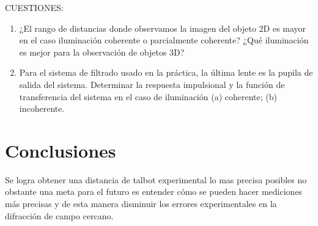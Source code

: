 \documentclass{./packages/optica-article}
\begin{document}
CUESTIONES:
\begin{enumerate}
\item ¿El rango de distancias donde observamos la imagen del objeto 2D es mayor en el caso iluminación coherente o parcialmente coherente? ¿Qué iluminación es mejor para la observación de objetos 3D?
\item Para el sistema de filtrado usado en la práctica, la última lente es la pupila de salida del sistema. Determinar la respuesta impulsional y la función de transferencia del sistema en el caso de iluminación (a) coherente; (b) incoherente.

\end{enumerate}

\section{Conclusiones}
Se logra obtener una distancia de talbot experimental lo mas precisa posibles no obstante  una meta para el futuro es entender cómo se pueden hacer mediciones más precisas y de esta manera disminuir los errores experimentales en la difracción de campo cercano.


\end{document}

